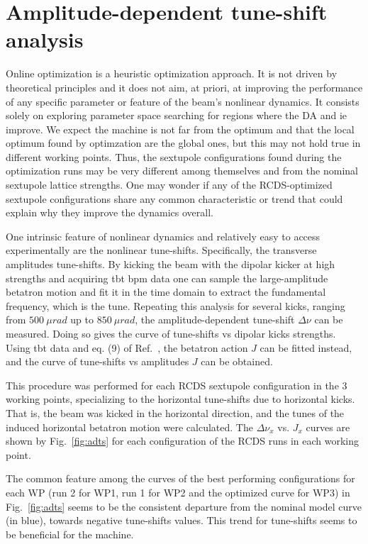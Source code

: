 \section{Amplitude-dependent tune-shift analysis}
Online optimization is a heuristic optimization approach. It is not driven by theoretical principles and it does not aim, at priori, at improving the performance of any specific parameter or feature of the beam's nonlinear dynamics. It consists solely on exploring parameter space searching for regions where the \gls*{DA} and \gls*{ie} improve. We expect the machine is not far from the optimum and  that the local optimum found by optimzation are the global ones, but this may not hold true in different working points. Thus, the sextupole configurations found during the optimization runs may be very different among themselves and from the nominal sextupole lattice strengths. One may wonder if any of the \gls*{RCDS}-optimized sextupole configurations share any common characteristic or trend that could explain why they improve the dynamics overall.

One intrinsic feature of nonlinear dynamics and relatively easy to access experimentally are the nonlinear tune-shifts. Specifically, the transverse amplitudes tune-shifts. By kicking the beam with the dipolar kicker at high strengths and acquiring \gls*{tbt} \gls*{bpm} data one can sample the large-amplitude betatron motion and fit it in the time domain to extract the fundamental frequency, which is the tune. Repeating this analysis for  several kicks, ranging from $500~\unit{\mu rad}$ up to $850~\unit{\mu rad}$, the amplitude-dependent tune-shift $\Delta\nu$ can be measured. Doing so gives the curve of tune-shifts vs dipolar kicks strengths. Using \gls*{tbt} data and eq. (9) of Ref.~\cite{resende_equilibrium_2021}, the betatron action $J$ can be fitted instead, and the curve of tune-shifts vs amplitudes $J$ can be obtained.

This procedure was performed for each \gls*{RCDS} sextupole configuration in the 3 working points, specializing to the horizontal tune-shifts due to horizontal kicks. That is, the beam was kicked in the horizontal direction, and the tunes of the induced horizontal betatron motion were calculated. The $\Delta \nu_x$ vs. $J_x$ curves are shown by Fig.~\ref{fig:adts} for each configuration of the \gls*{RCDS} runs in each working point.

The common feature among the curves of the best performing configurations for each WP (run 2 for \gls*{WP1}, run 1 for \gls*{WP2} and the optimized curve for \gls*{WP3}) in Fig.~\ref{fig:adts} seems to be the consistent departure from the nominal model curve (in blue), towards negative tune-shifts values. This trend for tune-shifts seems to be beneficial for the machine.

